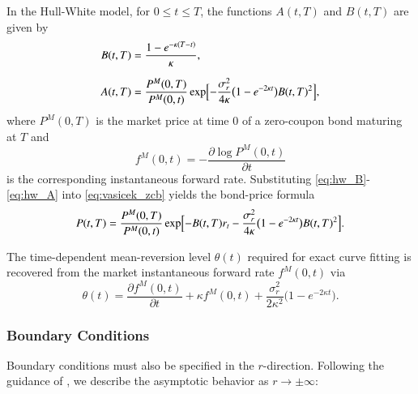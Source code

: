\documentclass[12pt]{report} %
\theoremstyle{plain} %
\theoremstyle{definition} %
\theoremstyle{remark} %
\begin{document}
In the Hull-White model, for \(0\le t\le T\), the functions \(A(t,T)\) and \(B(t,T)\) are given by \cite{brigo2013interest}
\begin{align}
 B(t,T) &= \frac{1-e^{-\kappa (T-t)}}{\kappa},\label{eq:hw_B}\\[6pt]
 A(t,T) &= \frac{P^{M}(0,T)}{P^{M}(0,t)}
      \exp\Bigl[
       -\frac{\sigma_r^{2}}{4\kappa}\bigl(1-e^{-2\kappa t}\bigr)B(t,T)^{2}
      \Bigr],\label{eq:hw_A}
\end{align}
where \(P^{M}(0,T)\) is the market price at time \(0\) of a zero-coupon bond maturing at \(T\) and
\[f^{M}(0,t) = -\frac{\partial\log P^{M}(0,t)}{\partial t}\]
 is the corresponding instantaneous forward rate. Substituting \eqref{eq:hw_B}-\eqref{eq:hw_A} into \eqref{eq:vasicek_zcb} yields the bond-price formula
\begin{equation}\label{eq:hw_zcb_calibrated}
 P(t,T)=\frac{P^{M}(0,T)}{P^{M}(0,t)}
     \exp\Bigl[
      -B(t,T) r_t
      -\frac{\sigma_r^{2}}{4\kappa}\bigl(1-e^{-2\kappa t}\bigr)B(t,T)^{2}
     \Bigr].
\end{equation}

The time-dependent mean-reversion level \(\theta(t)\) required for exact curve
fitting is recovered from the market instantaneous forward rate \(f^{M}(0,t)\) via
\begin{equation}\label{eq:hw_theta}
 \theta(t)
 = \frac{\partial f^{M}(0,t)}{\partial t}
  + \kappa f^{M}(0,t)
  + \frac{\sigma_r^{2}}{2\kappa^{2}}\bigl(1-e^{-2\kappa t}\bigr).
\end{equation}

\subsubsection{Boundary Conditions}

Boundary conditions must also be specified in the \( r \)-direction. Following the 
guidance of \cite{duffy2022numerical}, we describe the asymptotic 
behavior as \( r \to \pm\infty \):
\end{document}
